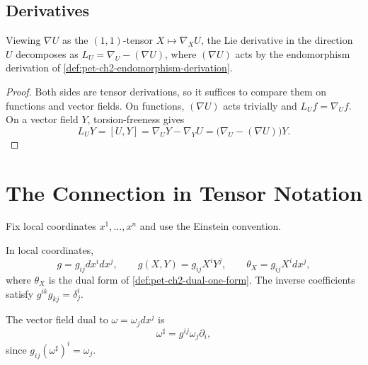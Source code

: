 \subsection{Derivatives}

\begin{proposition}
  \label{prop:pet-ch2-lie-derivative-as-endomorphism-derivation}
  \leanok
  Viewing $\nabla U$ as the $(1,1)$-tensor $X\mapsto\nabla_XU$, the Lie
  derivative in the direction $U$ decomposes as $L_U=\nabla_U-(\nabla U)$,
  where $(\nabla U)$ acts by the endomorphism derivation of
  \cref{def:pet-ch2-endomorphism-derivation}.
\end{proposition}
\begin{proof}
  \leanok
  \sketch
  Both sides are
  tensor derivations, so it suffices to compare them on functions and vector
  fields. On functions, $(\nabla U)$ acts trivially and
  $L_Uf=\nabla_Uf$. On a vector field $Y$, torsion-freeness gives
  \[
    L_UY=[U,Y]=\nabla_UY-\nabla_YU
      =\big(\nabla_U-(\nabla U)\big)Y.
  \]
\end{proof}

\section{The Connection in Tensor Notation}

Fix local coordinates $x^1,\dots,x^n$ and use the Einstein convention.

\begin{definition}
  \label{def:pet-ch2-metric-coordinate-formulas}
  \leanok
  In local coordinates,
  \[
    g=g_{ij}dx^i dx^j,\qquad
    g(X,Y)=g_{ij}X^iY^j,\qquad
    \theta_X=g_{ij}X^i dx^j,
  \]
  where $\theta_X$ is the dual form of \cref{def:pet-ch2-dual-one-form}.
  The inverse coefficients satisfy $g^{ik}g_{kj}=\delta^i_j$.
\end{definition}

\begin{definition}
  \label{def:pet-ch2-vector-dual-to-form}
  \leanok
  The vector field dual to
  $\omega=\omega_jdx^j$ is
  \[
    \omega^\sharp=g^{ij}\omega_j\partial_i,
  \]
  since $g_{ij}(\omega^\sharp)^i=\omega_j$.
\end{definition}

